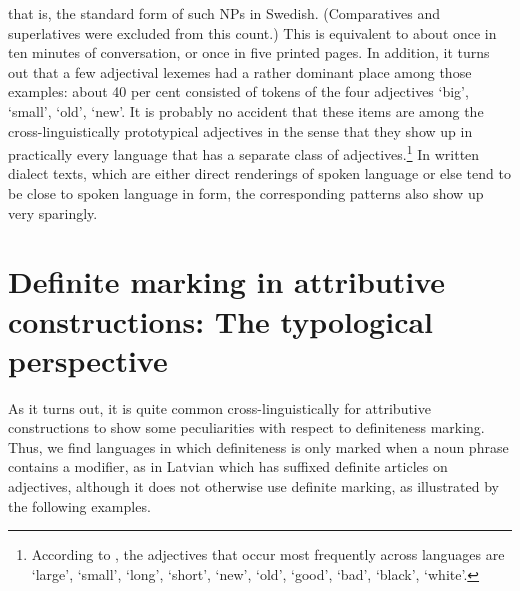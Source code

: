 that is, the standard form of such NPs in Swedish. (Comparatives and superlatives were excluded from this count.) This is equivalent to about once in ten minutes of conversation, or once in five printed pages. In addition, it turns out that a few adjectival lexemes had a rather dominant place among those examples: about 40 per cent consisted of tokens of the four adjectives ‘big’,  ‘small’,  ‘old’,  ‘new’. It is probably no accident that these items are among the cross-linguistically prototypical adjectives in the sense that they show up in practically every language that has a separate class of adjectives.\footnote{\label{fnt:ftn36} According to \citet{Dixon1977}, the adjectives that occur most frequently across languages are ‘large’, ‘small’, ‘long’, ‘short’, ‘new’, ‘old’, ‘good’, ‘bad’, ‘black’, ‘white’.} In written dialect texts, which are either direct renderings of spoken language or else tend to be close to spoken language in form, the corresponding patterns also show up very sparingly.


\section{Definite marking in attributive constructions: The typological perspective}

As it turns out, it is quite common cross-linguistically for attributive constructions to show some peculiarities with respect to definiteness marking. Thus, we find languages in which definiteness is only marked when a noun phrase contains a modifier, as in Latvian which has suffixed definite articles on adjectives, although it does not otherwise use definite marking, as illustrated by the following examples. 


\ea\label{}

\z 
\z 

